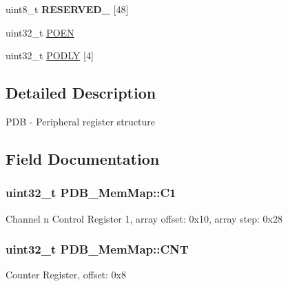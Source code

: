 \begin{DoxyCompactItemize}
\begin{tabbing}
\end{tabbing}\item 
\hypertarget{struct_p_d_b___mem_map_a7c028c218b26078db2795a35ab315266}{}uint8\+\_\+t {\bfseries R\+E\+S\+E\+R\+V\+E\+D\+\_} \mbox{[}48\mbox{]}\label{struct_p_d_b___mem_map_a7c028c218b26078db2795a35ab315266}

\item 
uint32\+\_\+t \hyperlink{struct_p_d_b___mem_map_a259dc7b16cc8f12022cb6a5befb1660c}{P\+O\+E\+N}
\item 
uint32\+\_\+t \hyperlink{struct_p_d_b___mem_map_a69081c41b606ea7a699a67e266a785d5}{P\+O\+D\+L\+Y} \mbox{[}4\mbox{]}
\end{DoxyCompactItemize}


\subsection{Detailed Description}
P\+D\+B -\/ Peripheral register structure 

\subsection{Field Documentation}
\hypertarget{struct_p_d_b___mem_map_a7f3d427467fd70574b129f2ecd5a84ed}{}
\subsubsection[{C1}]{\setlength{\rightskip}{0pt plus 5cm}uint32\+\_\+t P\+D\+B\+\_\+\+Mem\+Map\+::\+C1}\label{struct_p_d_b___mem_map_a7f3d427467fd70574b129f2ecd5a84ed}
Channel n Control Register 1, array offset\+: 0x10, array step\+: 0x28 \hypertarget{struct_p_d_b___mem_map_a2e90754ac53cdee38eec08416fee494e}{}
\subsubsection[{C\+N\+T}]{\setlength{\rightskip}{0pt plus 5cm}uint32\+\_\+t P\+D\+B\+\_\+\+Mem\+Map\+::\+C\+N\+T}\label{struct_p_d_b___mem_map_a2e90754ac53cdee38eec08416fee494e}
Counter Register, offset\+: 0x8 \hypertarget{struct_p_d_b___mem_map_a101a3b427fd438fc5dd9069f9d3f31d6}{}
